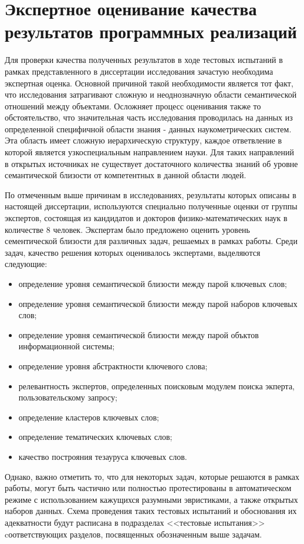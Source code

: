 \section{Экспертное оценивание качества результатов программных реализаций} \label{experts_introduction}
Для проверки качества полученных результатов в ходе тестовых испытаний в рамках представленного в диссертации исследования зачастую необходима экспертная оценка. Основной причиной такой необходимости является тот факт, что исследования затрагивают сложную и неоднозначную области семантической отношений между объектами. Осложняет процесс оценивания также то обстоятельство, что значительная часть исследования проводилась на данных из определенной специфичной области знания - данных наукометрических систем. Эта область имеет сложную иерархическую структуру, каждое ответвление в которой является узкоспециальным направлением науки. Для таких направлений в открытых источниках не существует достаточного количества знаний об уровне семантической близости от компетентных в данной области людей.

По отмеченным выше причинам в исследованиях, результаты которых описаны в настоящей диссертации, используются специально полученные оценки от группы экспертов, состоящая из кандидатов и докторов физико-математических наук в количестве 8 человек. Экспертам было предложено оценить уровень сементической близости для различных задач, решаемых в рамках работы. Среди задач, качество решения которых оценивалось экспертами, выделяются следующие:
\begin{itemize}
    \item определение уровня семантической близости между парой ключевых слов;
    \item определение уровня семантической близости между парой наборов ключевых слов;
    \item определение уровня семантической близости между парой объктов информационной системы;
    \item определение уровня абстрактности ключевого слова;
    \item релевантность экспертов, определенных поисковым модулем поиска экперта, пользовательскому запросу;
    \item определение кластеров ключевых слов;
    \item определение тематических ключевых слов;
    \item качество построяния тезауруса ключевых слов.
\end{itemize}

Однако, важно отметить то, что для некоторых задач, которые решаются в рамках работы, могут быть частично или полностью протестированы в автоматическом режиме с использованием кажущихся разумными эвристиками, а также открытых наборов данных. Схема проведения таких тестовых испытаний и обоснования их адекватности будут расписана в подразделах <<тестовые испытания>> cоответствующих разделов, посвященных обозначенным выше задачам.

